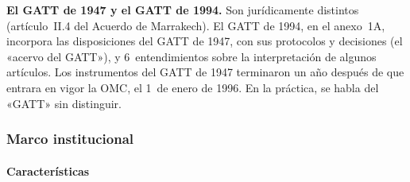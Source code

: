 \documentclass[11pt]{article}
\begin{document}
\begin{anotaciones}
\textbf{El GATT de 1947 y el GATT de 1994.} Son jurídicamente distintos (artículo~II.4 del Acuerdo de Marrakech). El GATT de 1994, en el anexo~1A, incorpora las disposiciones del GATT de 1947, con sus protocolos y decisiones (el «acervo del GATT»), y 6~entendimientos sobre la interpretación de algunos artículos. Los instrumentos del GATT de 1947 terminaron un año después de que entrara en vigor la OMC, el 1~de enero de 1996. En la práctica, se habla del «GATT» sin distinguir\nocite{OMC1994GATT}.
\end{anotaciones}

\subsubsection{Marco institucional}\label{sec:institucional}

\paragraph{Características}
\end{document}
